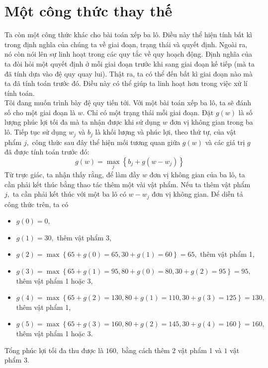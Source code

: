 \documentclass[12pt,a4paper]{article}
\begin{document}
\section{Một công thức thay thế}
Ta còn một công thức khác cho bài toán xếp ba lô. Điều này thể hiện tính bất kì trong định nghĩa của chúng ta về giai đoạn, trạng thái và quyết định. Ngoài ra, nó còn nói lên sự linh hoạt trong các quy tắc về quy hoạch động. Định nghĩa của ta đòi hỏi một quyết định ở mỗi giai đoạn trước khi sang giai đoạn kế tiếp (mà ta đã tính dựa vào đệ quy quay lui). Thật ra, ta có thể đến bất kì giai đoạn nào mà ta đã tính toán trước đó. Điều này có thể giúp ta linh hoạt hơn trong việc xử lí tính toán.\\
Tôi đang muốn trình bày đệ quy tiến tới. Với một bài toán xếp ba lô, ta sẽ đánh số cho một giai đoạn là \(w.\) Chỉ có một trạng thái mỗi giai đoạn. Đặt \(g\left( w \right)\) là số lượng phúc lợi tối đa mà ta nhận được khi sử dụng \(w\) đơn vị không gian trong ba lô. Tiếp tục sử dụng \(w_j\) và \(b_j\) là khối lượng và phúc lợi, theo thứ tự, của vật phẩm \(j,\) công thức sau đây thể hiện mối tương quan giữa \(g\left( w \right)\) và các giá trị \(g\) đã được tính toán trước đó:
\[g\left( w \right) = \mathop {\max }\limits_j \left\{ {{b_j} + g\left( {w - {w_j}} \right)} \right\}\]
Từ trực giác, ta nhận thấy rằng, để làm đầy \(w\) đơn vị không gian của ba lô, ta cần phải kết thúc bằng thao tác thêm một vài vật phẩm. Nếu ta thêm vật phẩm \(j,\) ta cần phải kết thúc với một ba lô có \(w - w_j\) đơn vị không gian. Để diễn tả công thức trên, ta có
\begin{itemize}
\item \(g\left( 0 \right) = 0,\)
\item \(g\left( 1 \right) = 30,\) thêm vật phẩm 3,
\item \(g\left( 2 \right) = \max \left\{ {65 + g\left( 0 \right) = 65,30 + g\left( 1 \right) = 60} \right\} = 65,\) thêm vật phẩm 1,
\item \(g\left( 3 \right) = \max \left\{ {65 + g\left( 1 \right) = 95,80 + g\left( 0 \right) = 80,30 + g\left( 2 \right) = 95} \right\} = 95,\) thêm vật phẩm 1 hoặc 3,
\item \(g\left( 4 \right) = \max \left\{ {65 + g\left( 2 \right) = 130,80 + g\left( 1 \right) = 110,30 + g\left( 3 \right) = 125} \right\} = 130,\) thêm vật phẩm 1,
\item \(g\left( 5 \right) = \max \left\{ {65 + g\left( 3 \right) = 160,80 + g\left( 2 \right) = 145,30 + g\left( 4 \right) = 160} \right\} = 160,\) thêm vật phẩm 1 hoặc 3.
\end{itemize}
Tổng phúc lợi tối đa thu được là \(160,\) bằng cách thêm \(2\) vật phẩm 1 và \(1\) vật phẩm 3.
\end{document}
